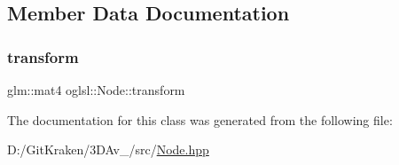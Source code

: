 \subsection{Member Data Documentation}
\mbox{\label{classoglsl_1_1_node_a6b7251cdc6e62932d29f9094347b9e01}} 
\subsubsection{\texorpdfstring{transform}{transform}}
{\footnotesize\ttfamily glm\+::mat4 oglsl\+::\+Node\+::transform\hspace{0.3cm}{\ttfamily [protected]}}



The documentation for this class was generated from the following file\+:\begin{DoxyCompactItemize}
\item 
D\+:/\+Git\+Kraken/3\+D\+Av\+\_/src/\mbox{\hyperlink{_node_8hpp}{Node.\+hpp}}\end{DoxyCompactItemize}

